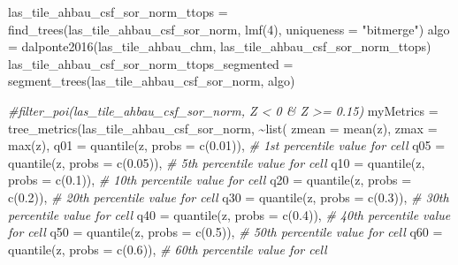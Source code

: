 \documentclass[
]{article}
\newenvironment{Shaded}{\begin{snugshade}}{\end{snugshade}}
\newcommand{\AttributeTok}[1]{\textcolor[rgb]{0.77,0.63,0.00}{#1}}
\newcommand{\CommentTok}[1]{\textcolor[rgb]{0.56,0.35,0.01}{\textit{#1}}}
\newcommand{\DecValTok}[1]{\textcolor[rgb]{0.00,0.00,0.81}{#1}}
\newcommand{\FloatTok}[1]{\textcolor[rgb]{0.00,0.00,0.81}{#1}}
\newcommand{\FunctionTok}[1]{\textcolor[rgb]{0.00,0.00,0.00}{#1}}
\newcommand{\NormalTok}[1]{#1}
\newcommand{\OtherTok}[1]{\textcolor[rgb]{0.56,0.35,0.01}{#1}}
\newcommand{\SpecialCharTok}[1]{\textcolor[rgb]{0.00,0.00,0.00}{#1}}
\newcommand{\StringTok}[1]{\textcolor[rgb]{0.31,0.60,0.02}{#1}}
\begin{document}
\begin{Shaded}
\begin{Highlighting}[]
\NormalTok{las\_tile\_ahbau\_csf\_sor\_norm\_ttops }\OtherTok{=} \FunctionTok{find\_trees}\NormalTok{(las\_tile\_ahbau\_csf\_sor\_norm, }\FunctionTok{lmf}\NormalTok{(}\DecValTok{4}\NormalTok{), }\AttributeTok{uniqueness =} \StringTok{"bitmerge"}\NormalTok{)}
\NormalTok{algo }\OtherTok{=} \FunctionTok{dalponte2016}\NormalTok{(las\_tile\_ahbau\_chm, las\_tile\_ahbau\_csf\_sor\_norm\_ttops)}
\NormalTok{las\_tile\_ahbau\_csf\_sor\_norm\_ttops\_segmented }\OtherTok{=} \FunctionTok{segment\_trees}\NormalTok{(las\_tile\_ahbau\_csf\_sor\_norm, algo)}


\CommentTok{\#filter\_poi(las\_tile\_ahbau\_csf\_sor\_norm, Z \textless{} 0 \& Z \textgreater{}= 0.15)}
\NormalTok{myMetrics }\OtherTok{=} \FunctionTok{tree\_metrics}\NormalTok{(las\_tile\_ahbau\_csf\_sor\_norm, }\SpecialCharTok{\textasciitilde{}}\FunctionTok{list}\NormalTok{(}
    \AttributeTok{zmean   =} \FunctionTok{mean}\NormalTok{(z),}
    \AttributeTok{zmax    =} \FunctionTok{max}\NormalTok{(z),}
    \AttributeTok{q01     =} \FunctionTok{quantile}\NormalTok{(z, }\AttributeTok{probs =} \FunctionTok{c}\NormalTok{(}\FloatTok{0.01}\NormalTok{)),     }\CommentTok{\# 1st percentile value for cell}
    \AttributeTok{q05     =} \FunctionTok{quantile}\NormalTok{(z, }\AttributeTok{probs =} \FunctionTok{c}\NormalTok{(}\FloatTok{0.05}\NormalTok{)),     }\CommentTok{\# 5th percentile value for cell}
    \AttributeTok{q10     =} \FunctionTok{quantile}\NormalTok{(z, }\AttributeTok{probs =} \FunctionTok{c}\NormalTok{(}\FloatTok{0.1}\NormalTok{)),      }\CommentTok{\# 10th percentile value for cell}
    \AttributeTok{q20     =} \FunctionTok{quantile}\NormalTok{(z, }\AttributeTok{probs =} \FunctionTok{c}\NormalTok{(}\FloatTok{0.2}\NormalTok{)),      }\CommentTok{\# 20th percentile value for cell}
    \AttributeTok{q30     =} \FunctionTok{quantile}\NormalTok{(z, }\AttributeTok{probs =} \FunctionTok{c}\NormalTok{(}\FloatTok{0.3}\NormalTok{)),      }\CommentTok{\# 30th percentile value for cell}
    \AttributeTok{q40     =} \FunctionTok{quantile}\NormalTok{(z, }\AttributeTok{probs =} \FunctionTok{c}\NormalTok{(}\FloatTok{0.4}\NormalTok{)),      }\CommentTok{\# 40th percentile value for cell}
    \AttributeTok{q50     =} \FunctionTok{quantile}\NormalTok{(z, }\AttributeTok{probs =} \FunctionTok{c}\NormalTok{(}\FloatTok{0.5}\NormalTok{)),      }\CommentTok{\# 50th percentile value for cell}
    \AttributeTok{q60     =} \FunctionTok{quantile}\NormalTok{(z, }\AttributeTok{probs =} \FunctionTok{c}\NormalTok{(}\FloatTok{0.6}\NormalTok{)),      }\CommentTok{\# 60th percentile value for cell}

\end{Highlighting}
\end{Shaded}
\end{document}
